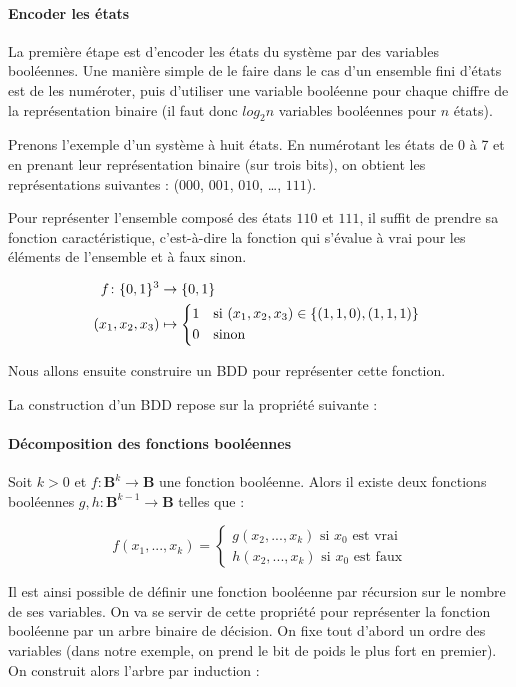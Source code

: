\paragraph{Encoder les états}
La première étape est d'encoder les états du système par des variables
booléennes. Une manière simple de le faire dans le cas d'un ensemble fini
d'états est de les numéroter, puis d'utiliser une variable booléenne pour chaque
chiffre de la représentation binaire (il faut donc \(log_2 n\) variables
booléennes pour \(n\) états).

Prenons l'exemple d'un système à huit états. En numérotant les états de 0 à 7 et
en prenant leur représentation binaire (sur trois bits), on obtient les
représentations suivantes : (\(000\), \(001\), \(010\), \dots, \(111\)).


Pour représenter l'ensemble composé des états \(110\) et \(111\), il suffit
de prendre sa fonction caractéristique, c'est-à-dire la fonction qui s'évalue à
vrai pour les éléments de l'ensemble et à faux sinon.

\begin{align}
  f \colon \{0, 1\}^3 & \to \{0, 1\} \\
  (x_1, x_2, x_3) & \mapsto
  \begin{cases*}
    1 & si \((x_1, x_2, x_3) \in \{(1,1,0), (1,1,1)\}\) \\
    0 & sinon
  \end{cases*}
\end{align}

Nous allons ensuite construire un BDD pour représenter cette fonction.

La construction d'un BDD repose sur la propriété suivante :

\paragraph{Décomposition des fonctions booléennes}
Soit \(k > 0\) et \(f: \mathbf{B}^k \to \mathbf{B}\) une
fonction booléenne. Alors il existe deux fonctions booléennes
\(g, h : \mathbf{B}^{k-1} \to \mathbf{B}\) telles que :

\[
f(x_1, ..., x_k) =
\begin{cases*}
  g(x_2, ..., x_k) \text{ si $x_0$ est vrai}\\
  h(x_2, ..., x_k) \text{ si $x_0$ est faux}
\end{cases*}
\]

Il est ainsi possible de définir une fonction booléenne par récursion
sur le nombre de ses variables. On va se servir de cette propriété pour
représenter la fonction booléenne par un arbre binaire de décision. On
fixe tout d'abord un ordre des variables (dans notre exemple, on prend
le bit de poids le plus fort en premier). On construit alors l'arbre
par induction :

